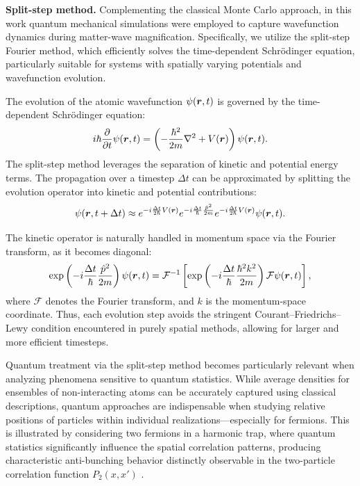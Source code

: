 \textbf{Split-step method.}
Complementing the classical Monte Carlo approach, in this work quantum mechanical simulations were employed to capture wavefunction dynamics during matter-wave magnification. Specifically, we utilize the split-step Fourier method, which efficiently solves the time-dependent Schrödinger equation, particularly suitable for systems with spatially varying potentials and wavefunction evolution.

The evolution of the atomic wavefunction $\psi(\boldsymbol{r}, t)$ is governed by the time-dependent Schrödinger equation:
\begin{equation*}
i\hbar\frac{\partial}{\partial t}\psi(\boldsymbol{r}, t) = \left(-\frac{\hbar^2}{2m}\nabla^2 + V(\boldsymbol{r})\right)\psi(\boldsymbol{r}, t).
\end{equation*}
The split-step method leverages the separation of kinetic and potential energy terms. The propagation over a timestep $\Delta t$ can be approximated by splitting the evolution operator into kinetic and potential contributions:
\begin{equation*}
\psi(\boldsymbol{r}, t + \Delta t) \approx e^{-i\frac{\Delta t}{2\hbar}V(\boldsymbol{r})} e^{-i\frac{\Delta t}{\hbar}\frac{\hat{p}^2}{2m}} e^{-i\frac{\Delta t}{2\hbar}V(\boldsymbol{r})}\psi(\boldsymbol{r}, t).
\end{equation*}

The kinetic operator is naturally handled in momentum space via the Fourier transform, as it becomes diagonal:
\begin{equation*}
\exp\left(-i\frac{\Delta t}{\hbar}\frac{\hat{p}^2}{2m}\right)\psi(\boldsymbol{r}, t) = \mathcal{F}^{-1}\left[\exp\left(-i\frac{\Delta t}{\hbar}\frac{\hbar^2 k^2}{2m}\right)\mathcal{F}{\psi(\boldsymbol{r}, t)}\right],
\end{equation*}
where $\mathcal{F}$ denotes the Fourier transform, and $k$ is the momentum-space coordinate. Thus, each evolution step avoids the stringent Courant–Friedrichs–Lewy condition encountered in purely spatial methods, allowing for larger and more efficient timesteps.

Quantum treatment via the split-step method becomes particularly relevant when analyzing phenomena sensitive to quantum statistics. While average densities for ensembles of non-interacting atoms can be accurately captured using classical descriptions, quantum approaches are indispensable when studying relative positions of particles within individual realizations—especially for fermions. This is illustrated by considering two fermions in a harmonic trap, where quantum statistics significantly influence the spatial correlation patterns, producing characteristic anti-bunching behavior distinctly observable in the two-particle correlation function $P_2(x,x')$ \cite{bergschneider_experimental_2019}.

